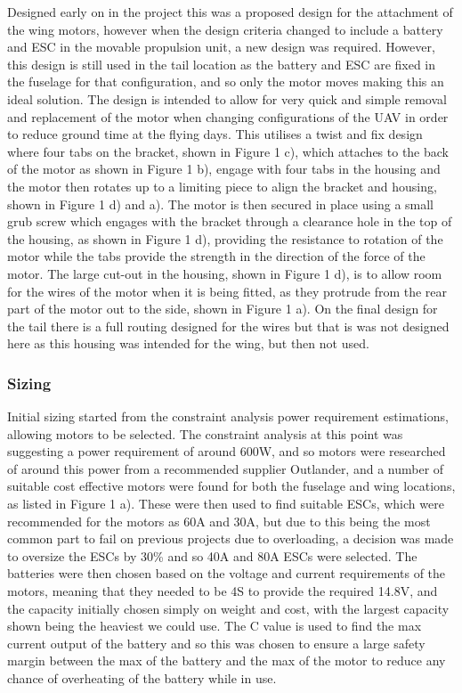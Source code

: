 \documentclass[../../main.tex]{subfiles}
\begin{document}
Designed early on in the project this was a proposed design for the attachment of the wing motors, however when the design criteria changed to include a battery and ESC in the movable propulsion unit, a new design was required.
However, this design is still used in the tail location as the battery and ESC are fixed in the fuselage for that configuration, and so only the motor moves making this an ideal solution.
The design is intended to allow for very quick and simple removal and replacement of the motor when changing configurations of the UAV in order to reduce ground time at the flying days.
This utilises a twist and fix design where four tabs on the bracket, shown in Figure 1 c), which attaches to the back of the motor as shown in Figure 1 b), engage with four tabs in the housing and the motor then rotates up to a limiting piece to align the bracket and housing, shown in Figure 1 d) and a).
The motor is then secured in place using a small grub screw which engages with the bracket through a clearance hole in the top of the housing, as shown in Figure 1 d), providing the resistance to rotation of the motor while the tabs provide the strength in the direction of the force of the motor.
The large cut-out in the housing, shown in Figure 1 d), is to allow room for the wires of the motor when it is being fitted, as they protrude from the rear part of the motor out to the side, shown in Figure 1 a).
On the final design for the tail there is a full routing designed for the wires but that is was not designed here as this housing was intended for the wing, but then not used.

\subsubsection{Sizing} \label{sec:design-process:initial-designs:propulsion:sizing}

Initial sizing started from the constraint analysis power requirement estimations, allowing motors to be selected.
The constraint analysis at this point was suggesting a power requirement of around 600W, and so motors were researched of around this power from a recommended supplier Outlander, and a number of suitable cost effective motors were found for both the fuselage and wing locations, as listed in Figure 1 a).
These were then used to find suitable ESCs, which were recommended for the motors as 60A and 30A, but due to this being the most common part to fail on previous projects due to overloading, a decision was made to oversize the ESCs by 30\% and so 40A and 80A ESCs were selected.
The batteries were then chosen based on the voltage and current requirements of the motors, meaning that they needed to be 4S to provide the required 14.8V, and the capacity initially chosen simply on weight and cost, with the largest capacity shown being the heaviest we could use.
The C value is used to find the max current output of the battery and so this was chosen to ensure a large safety margin between the max of the battery and the max of the motor to reduce any chance of overheating of the battery while in use. 
\end{document}
